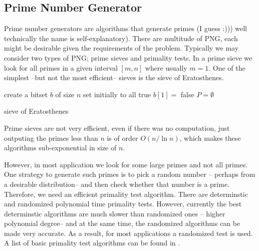 \documentclass{article}
\begin{document}
\subsection{Prime Number Generator}
Prime number generators are algorithms that generate primes (I guess :))) well technically the name is self-explanatory). There are multitude of PNG, each might be desirable given the requirements of the problem. Typically we may consider two types of PNG; prime sieves and primality tests. In a prime sieve we look for all primes in a given interval \([m,n]\) where usually \(m = 1\). One of the simplest --but not the most efficient-- sieves is the sieve of Eratosthenes. 
\begin{algorithm}
	\DontPrintSemicolon
	create a bitset \(b\) of size \(n\) set initially to all true\;
	\(b[1] =\) false\;
	\(P = \emptyset\)\;
	\caption{sieve of Eratosthenes}
\end{algorithm}
Prime sieves are not very efficient, even if there was no computation, just outputing the primes less than \(n\) is of order \(O(n/\ln n)\), which makes these algorithms sub-exponential in size of \(n\). 

However, in most application we look for some large primes and not all primes. One  strategy to generate such primes is to pick a random number -- perhaps from a desirable distribution-- and then check whether that number is a prime. Therefore, we need an efficient primality test algorithm. There are determinstic and randomized polynomial time primality tests. However, currently the best determinstic algorithms are much slower than randomized ones -- higher polynomial degree-- and at the same time, the randomized algorithms can be made very accurate. As a result, for most applications a randomized test is used. A list of basic primality test algorithms can be found in \cite{das}.
\end{document}
